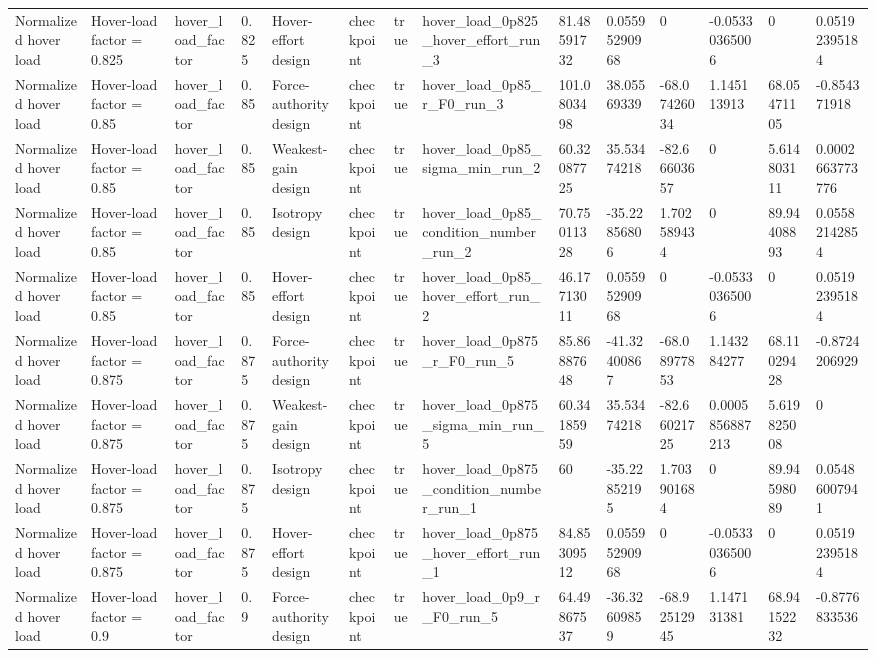 \begin{tabular}{@{}llllllllllllll@{}}
Normalized hover load & Hover-load factor = 0.825 & hover\_load\_factor & 0.825 & Hover-effort design & checkpoint & true & hover\_load\_0p825\_hover\_effort\_run\_3 & 81.48591732 & 0.05595290968 & 0 & -0.05330365006 & 0 & 0.05192395184 \\
Normalized hover load & Hover-load factor = 0.85 & hover\_load\_factor & 0.85 & Force-authority design & checkpoint & true & hover\_load\_0p85\_r\_F0\_run\_3 & 101.0803498 & 38.05569339 & -68.07426034 & 1.145113913 & 68.05471105 & -0.854371918 \\
Normalized hover load & Hover-load factor = 0.85 & hover\_load\_factor & 0.85 & Weakest-gain design & checkpoint & true & hover\_load\_0p85\_sigma\_min\_run\_2 & 60.32087725 & 35.53474218 & -82.66603657 & 0 & 5.614803111 & 0.0002663773776 \\
Normalized hover load & Hover-load factor = 0.85 & hover\_load\_factor & 0.85 & Isotropy design & checkpoint & true & hover\_load\_0p85\_condition\_number\_run\_2 & 70.75011328 & -35.22856806 & 1.702589434 & 0 & 89.94408893 & 0.05582142854 \\
Normalized hover load & Hover-load factor = 0.85 & hover\_load\_factor & 0.85 & Hover-effort design & checkpoint & true & hover\_load\_0p85\_hover\_effort\_run\_2 & 46.17713011 & 0.05595290968 & 0 & -0.05330365006 & 0 & 0.05192395184 \\
Normalized hover load & Hover-load factor = 0.875 & hover\_load\_factor & 0.875 & Force-authority design & checkpoint & true & hover\_load\_0p875\_r\_F0\_run\_5 & 85.86887648 & -41.32400867 & -68.08977853 & 1.143284277 & 68.11029428 & -0.8724206929 \\
Normalized hover load & Hover-load factor = 0.875 & hover\_load\_factor & 0.875 & Weakest-gain design & checkpoint & true & hover\_load\_0p875\_sigma\_min\_run\_5 & 60.34185959 & 35.53474218 & -82.66021725 & 0.0005856887213 & 5.619825008 & 0 \\
Normalized hover load & Hover-load factor = 0.875 & hover\_load\_factor & 0.875 & Isotropy design & checkpoint & true & hover\_load\_0p875\_condition\_number\_run\_1 & 60 & -35.22852195 & 1.703901684 & 0 & 89.94598089 & 0.05486007941 \\
Normalized hover load & Hover-load factor = 0.875 & hover\_load\_factor & 0.875 & Hover-effort design & checkpoint & true & hover\_load\_0p875\_hover\_effort\_run\_1 & 84.85309512 & 0.05595290968 & 0 & -0.05330365006 & 0 & 0.05192395184 \\
Normalized hover load & Hover-load factor = 0.9 & hover\_load\_factor & 0.9 & Force-authority design & checkpoint & true & hover\_load\_0p9\_r\_F0\_run\_5 & 64.49867537 & -36.32609859 & -68.92512945 & 1.147131381 & 68.94152232 & -0.8776833536 \\

\end{tabular}
